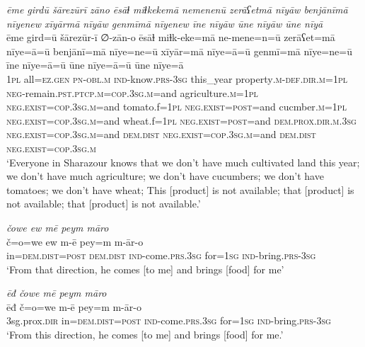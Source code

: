\ea \label{PM.37}
\textit{ēme girdū šārezūrī zāno ēsāɫ miɫkekemā nemenenū zerāʕetmā nīyāw benjānīmā nīyenew xīyārmā nīyāw genmīmā nīyenew īne nīyāw ūne nīyāw ūne nīyā} \\ 
\gll ēme gird=ū šārezūr-ī ∅-zān-o ēsāɫ miɫk-eke=mā ne-mene=n=ū zerāʕet=mā nīye=ā=ū benjānī=mā nīye=ne=ū xīyār=mā nīye=ā=ū genmī=mā nīye=ne=ū īne nīye=ā=ū ūne nīye=ā=ū ūne nīye=ā \\ 
 \textsc{1pl} all\textsc{\textsc{=ez.gen}} \textsc{pn}\textsc{-obl}\textsc{.m} \textsc{ind-}know\textsc{.prs}\textsc{-3sg} this\_year property\textsc{.m}\textsc{-def}\textsc{.dir}\textsc{.m}\textsc{=1pl} \textsc{neg-}remain\textsc{.pst}\textsc{.ptcp}\textsc{.m}\textsc{=cop}\textsc{.3sg}\textsc{.m}=and agriculture\textsc{.m}\textsc{=1pl} \textsc{\textsc{neg.}exist}\textsc{=cop}\textsc{.3sg}\textsc{.m}=and tomato.f\textsc{=1pl} \textsc{\textsc{neg.}exist}\textsc{=\textsc{post}}=and cucmber\textsc{.m}\textsc{=1pl} \textsc{\textsc{neg.}exist}\textsc{=cop}\textsc{.3sg}\textsc{.m}=and wheat.f\textsc{=1pl} \textsc{\textsc{neg.}exist}\textsc{=\textsc{post}}=and \textsc{dem.prox}\textsc{.dir}\textsc{.m}\textsc{.3sg} \textsc{\textsc{neg.}exist}\textsc{=cop}\textsc{.3sg}\textsc{.m}=and \textsc{dem.dist} \textsc{\textsc{neg.}exist}\textsc{=cop}\textsc{.3sg}\textsc{.m}=and \textsc{dem.dist} \textsc{\textsc{neg.}exist}\textsc{=cop}\textsc{.3sg}\textsc{.m} \\ 
\glt `Everyone in Sharazour knows that we don’t have much cultivated land this year; we don’t have much agriculture; we don’t have cucumbers; we don’t have tomatoes; we don’t have wheat; This [product] is not available; that [product] is not available; that [product] is not available.'
\z 
 
\ea \label{PM.46}
\textit{čowe ew mē peym māro} \\ 
\gll č=o=we ew m-ē pey=m m-ār-o \\ 
 in=\textsc{dem.dist}\textsc{=\textsc{post}} \textsc{dem.dist} \textsc{ind-}come\textsc{.prs}\textsc{.3sg} for\textsc{=\textsc{1sg}} \textsc{ind-}bring\textsc{.prs}\textsc{-3sg} \\ 
\glt `From that direction, he  comes [to me] and brings [food] for me'
\z 
 
\ea \label{PM.47}
\textit{ēđ čowe mē peym māro} \\ 
\gll ēđ č=o=we m-ē pey=m m-ār-o \\ 
 3sg.prox\textsc{.dir} in=\textsc{dem.dist}\textsc{=\textsc{post}} \textsc{ind-}come\textsc{.prs}\textsc{.3sg} for\textsc{=\textsc{1sg}} \textsc{ind-}bring\textsc{.prs}\textsc{-3sg} \\ 
\glt `From this direction, he  comes [to me] and brings [food] for me.'
\z 
 
